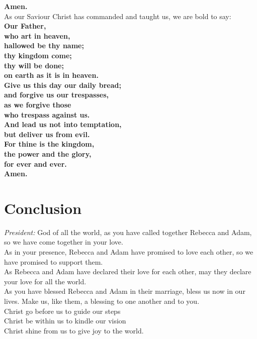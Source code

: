 \documentclass[a4paper,12pt,titlepage]{article}
\begin{document}
{\bf Amen.}\\

As our Saviour Christ has commanded and taught us, we are bold to say:\\

{\bf Our Father,\\
who art in heaven,\\
hallowed be thy name;\\
thy kingdom come;\\
thy will be done;\\
on earth as it is in heaven.\\
Give us this day our daily bread;\\
and forgive us our trespasses,\\
as we forgive those\\
who trespass against us.\\
And lead us not into temptation,\\
but deliver us from evil.\\
For thine is the kingdom,\\
the power and the glory,\\
for ever and ever.\\
Amen.}

\clearpage
\section{Conclusion}

{\em President:} God of all the world, as you have called together Rebecca and Adam, so we have come together in your love.\\
 
As in your presence, Rebecca and Adam have promised to love each other, so we have promised to support them.\\

As Rebecca and Adam have declared their love for each other, may they declare your love for all the world.\\

As you have blessed Rebecca and Adam in their marriage, bless us now in our lives.
Make us, like them, a blessing to one another and to you. \\

Christ go before us to guide our steps\\
Christ be within us to kindle our vision\\
Christ shine from us to give joy to the world.\\
\end{document}
